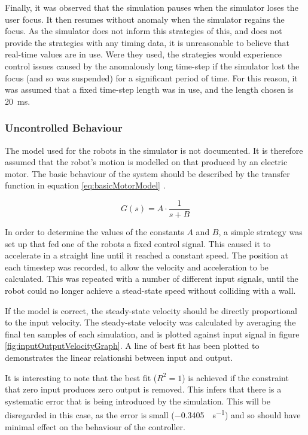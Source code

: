 \documentclass[10pt]{article} \usepackage[a4paper]{geometry}
\begin{document}
Finally, it was observed that the simulation pauses when the simulator loses the
user focus.  It then resumes without anomaly when the simulator regains the
focus.  As the simulator does not inform this strategies of this, and does not
provide the strategies with any timing data, it is unreasonable to believe that
real-time values are in use.  Were they used, the strategies would experience
control issues caused by the anomalously long time-step if the simulator lost
the focus (and so was suspended) for a significant period of time.  For this
reason, it was assumed that a fixed time-step length was in use, and the length
chosen is \SI{20}{\milli\second}.

\subsubsection{Uncontrolled Behaviour}

The model used for the robots in the simulator is not documented. It is
therefore assumed that the robot's motion is modelled on that produced by an
electric motor. The basic behaviour of the system should be described by the
transfer function in equation \ref{eq:basicMotorModel} \cite{basicControlNotes}.

\begin{equation}
 \label{eq:basicMotorModel}
 G\left(s\right) = A \cdot \frac{1}{s+B}
\end{equation}

In order to determine the values of the constants $A$ and $B$, a simple strategy
was set up that fed one of the robots a fixed control signal.  This caused it to
accelerate in a straight line until it reached a constant speed.  The position
at each timestep was recorded, to allow the velocity and acceleration to be
calculated.  This was repeated with a number of different input signals, until
the robot could no longer achieve a stead-state speed without colliding with a
wall.

If the model is correct, the steady-state velocity should be directly
proportional to the input velocity.  The steady-state velocity was calculated by
averaging the final ten samples of each simulation, and is plotted against input
signal in figure \ref{fig:inputOutputVelocityGraph}.  A line of best fit has
been plotted to demonstrates the linear relationshi between input and output.

It is interesting to note that the best fit ($R^2 = 1$) is achieved if the
constraint that zero input produces zero output is removed.  This infers that
there is a systematic error that is being introduced by the simulation.  This
will be disregarded in this case, as the error is small
(\SI{-0.3405}{\inch\per\second}) and so should have minimal effect on the
behaviour of the controller.
\end{document}
